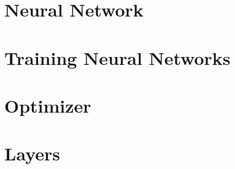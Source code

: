 \section{Neural Network}
\label{sec:neuralnetwork}


\section{Training Neural Networks}
\label{sec:training}


\section{Optimizer}
\label{sec:optimizer}


\section{Layers}
\label{sec:layers}
